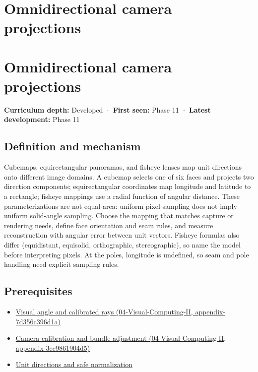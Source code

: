 \hypertarget{appendix-fc99ad39f351}{}
\section*{Omnidirectional camera projections}
\section{Omnidirectional camera projections}\label{appendix-fc99ad39f351-omnidirectional-camera-projections}

\textbf{Curriculum depth:} Developed · \textbf{First seen:} Phase 11 · \textbf{Latest development:} Phase 11

\subsection{Definition and mechanism}\label{appendix-fc99ad39f351-definition-and-mechanism}

Cubemaps, equirectangular panoramas, and fisheye lenses map unit directions onto different image domains. A cubemap selects one of six faces and projects two direction components; equirectangular coordinates map longitude and latitude to a rectangle; fisheye mappings use a radial function of angular distance. These parameterizations are not equal-area: uniform pixel sampling does not imply uniform solid-angle sampling. Choose the mapping that matches capture or rendering needs, define face orientation and seam rules, and measure reconstruction with angular error between unit vectors. Fisheye formulas also differ (equidistant, equisolid, orthographic, stereographic), so name the model before interpreting pixels. At the poles, longitude is undefined, so seam and pole handling need explicit sampling rules.

\subsection{Prerequisites}\label{appendix-fc99ad39f351-prerequisites}

\begin{itemize}
\tightlist
\item
  \href{../04-Visual-Computing-II/main.pdf\#nameddest=appendix-7d356c396d1a}{Visual angle and calibrated rays (04-Visual-Computing-II, appendix-7d356c396d1a)}
\item
  \href{../04-Visual-Computing-II/main.pdf\#nameddest=appendix-3ee9861904d5}{Camera calibration and bundle adjustment (04-Visual-Computing-II, appendix-3ee9861904d5)}
\item
  \hyperref[appendix-f744e41b95b4]{Unit directions and safe normalization}
\end{itemize}

